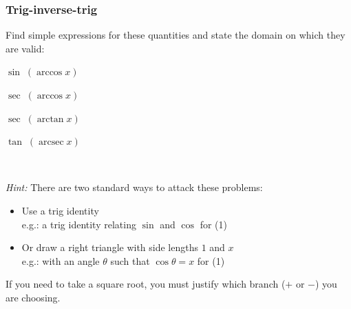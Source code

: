 \documentclass[14pt]{beamer}
\begin{document}
	\begin{frame}[t]
		\frametitle{Trig-inverse-trig}

		\begin{block}{}
			Find simple expressions for these quantities and state the domain on which
			they are valid:
			\begin{enumerate}
			\end{enumerate}
			\vspace{-.1cm}
		\end{block}

		\

		{\fontsize{13}{13}\selectfont \emph{Hint:} There are two standard ways to attack these problems: \begin{itemize}\item Use a trig identity \\ e.g.: a trig identity relating $\sin$ and $\cos$ for (1)

		\item Or draw a right triangle with side lengths $1$ and $x$ \\ e.g.: with an angle $\theta$ such that $\cos \theta = x$ for (1)\end{itemize} If you need to take a square root, you must justify which branch ($+$ or $-$) you are choosing. }
	\end{frame}

\end{document}
